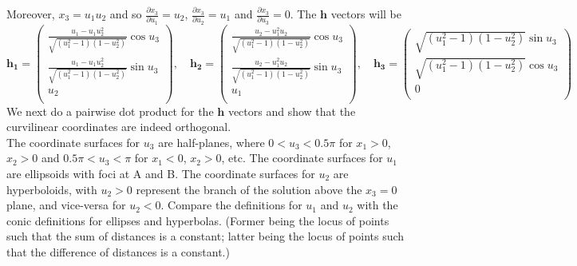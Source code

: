 \documentclass[a4paper]{article}
\begin{document}
\begin{ans}
Moreover, $x_3=u_1u_2$ and so $\frac{\partial x_3}{\partial u_1}=u_2$, $\frac{\partial x_3}{\partial u_2}=u_1$ and $\frac{\partial x_3}{\partial u_3}=0$. The $\mathbf{h}$ vectors will be
$$\mathbf{h_1}=\begin{pmatrix}\frac{u_1-u_1u_2^2}{\sqrt{(u_1^2-1)(1-u_2^2)}}\cos u_3\\\frac{u_1-u_1u_2^2}{\sqrt{(u_1^2-1)(1-u_2^2)}}\sin u_3\\u_2\\\end{pmatrix},\quad\mathbf{h_2}=\begin{pmatrix}\frac{u_2-u_1^2u_2}{\sqrt{(u_1^2-1)(1-u_2^2)}}\cos u_3\\\frac{u_2-u_1^2u_2}{\sqrt{(u_1^2-1)(1-u_2^2)}}\sin u_3\\u_1\\\end{pmatrix},\quad\mathbf{h_3}=\begin{pmatrix}\sqrt{(u_1^2-1)(1-u_2^2)}\sin u_3\\\sqrt{(u_1^2-1)(1-u_2^2)}\cos u_3\\0\\\end{pmatrix}$$
We next do a pairwise dot product for the $\mathbf{h}$ vectors and show that the curvilinear coordinates are indeed orthogonal.\\[5pt]
The coordinate surfaces for $u_3$ are half-planes, where $0<u_3<0.5\pi$ for $x_1>0$, $x_2>0$ and $0.5\pi<u_3<\pi$ for $x_1<0$, $x_2>0$, etc. The coordinate surfaces for $u_1$ are ellipsoids with foci at A and B. The coordinate surfaces for $u_2$ are hyperboloids, with $u_2>0$ represent the branch of the solution above the $x_3=0$ plane, and vice-versa for $u_2<0$. Compare the definitions for $u_1$ and $u_2$ with the conic definitions for ellipses and hyperbolas. (Former being the locus of points such that the sum of distances is a constant; latter being the locus of points such that the difference of distances is a constant.)
\begin{figure}[H]
    \centering

\end{figure}
\end{ans}
\end{document}
